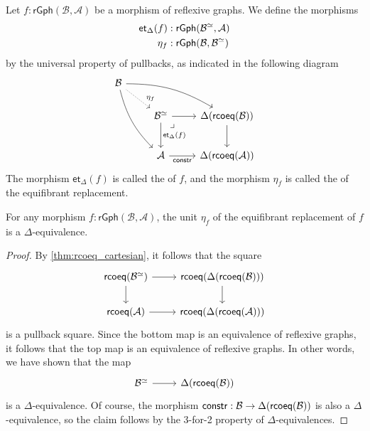 \begin{defn}
Let $f:\mathsf{rGph}(\mathcal{B},\mathcal{A})$ be a morphism of reflexive graphs. We define the morphisms
\begin{align*}
\mathsf{et}_\Delta(f) & : \mathsf{rGph}(\mathcal{B}^{\simeq},\mathcal{A}) \\
\mathsf{\eta}_f & : \mathsf{rGph}(\mathcal{B},\mathcal{B}^{\simeq})
\end{align*}
by the universal property of pullbacks, as indicated in the following diagram
\begin{equation*}
\begin{tikzcd}
\mathcal{B} \arrow[ddr,bend right=15] \arrow[drr,bend left=15] \arrow[dr,densely dotted,"\eta_f" near end] \\
& \mathcal{B}^{\eqvsym} \arrow[dr,phantom,"\lrcorner" {very near start,xshift=-1ex}] \arrow[d,"\mathsf{et}_\Delta(f)"] \arrow[r] & \Delta(\rcoeq(\mathcal{B})) \arrow[d] \\[1ex]
& \mathcal{A} \arrow[r,swap,"\mathsf{constr}"] & \Delta(\rcoeq(\mathcal{A}))
\end{tikzcd}
\end{equation*}
The morphism $\mathsf{et}_\Delta(f)$ is called the  of $f$, and the morphism $\eta_f$ is called the  of the equifibrant replacement.
\end{defn}

\begin{lem}\label{lem:D_equiv_pullback}
For any morphism $f:\mathsf{rGph}(\mathcal{B},\mathcal{A})$, the unit $\eta_f$ of the equifibrant replacement of $f$ is a $\Delta$-equivalence. 
\end{lem}

\begin{proof}
By \cref{thm:rcoeq_cartesian}, it follows that the square
\begin{equation*}
\begin{tikzcd}
\rcoeq(\mathcal{B}^{\eqvsym}) \arrow[d] \arrow[r] & \rcoeq(\Delta(\rcoeq(\mathcal{B}))) \arrow[d] \\
\rcoeq(\mathcal{A}) \arrow[r] & \rcoeq(\Delta(\rcoeq(\mathcal{A})))
\end{tikzcd}
\end{equation*}
is a pullback square. Since the bottom map is an equivalence of reflexive graphs, it follows that the top map is an equivalence of reflexive graphs. In other words, we have shown that the map
\begin{equation*}
\begin{tikzcd}
\mathcal{B}^{\eqvsym} \arrow[r] & \Delta(\rcoeq(\mathcal{B}))
\end{tikzcd}
\end{equation*}
is a $\Delta$-equivalence. Of course, the morphism $\mathsf{constr}:\mathcal{B}\to\Delta(\mathsf{rcoeq}(\mathcal{B}))$ is also a $\Delta$-equivalence, so the claim follows by the 3-for-2 property of $\Delta$-equivalences.
\end{proof}

